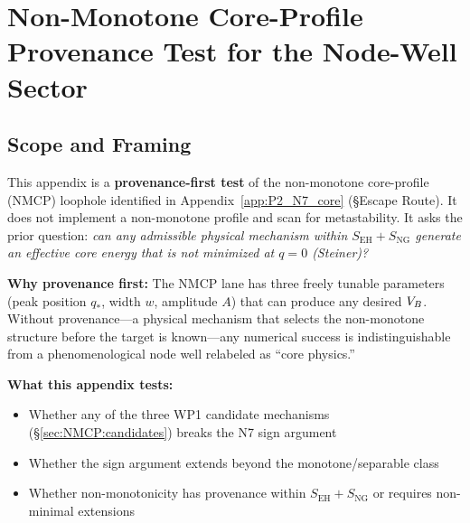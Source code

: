 
\chapter{Non-Monotone Core-Profile Provenance Test for the Node-Well Sector}
\label{app:P2_NMCP}

\section{Scope and Framing}
\label{sec:NMCP:scope}

This appendix is a \textbf{provenance-first test} of the non-monotone
core-profile (NMCP) loophole identified in Appendix~\ref{app:P2_N7_core}
(\S Escape Route). It does not implement a non-monotone profile and
scan for metastability. It asks the prior question: \emph{can any
admissible physical mechanism within $S_{\mathrm{EH}} + S_{\mathrm{NG}}$
generate an effective core energy that is not minimized at
$q = 0$ (Steiner)?}

\textbf{Why provenance first:} The NMCP lane has three freely tunable
parameters (peak position $q_*$, width $w$, amplitude $A$) that can
produce any desired $V_B$. Without provenance---a physical mechanism
that selects the non-monotone structure before the target is
known---any numerical success is indistinguishable from a
phenomenological node well relabeled as ``core physics.''

\textbf{What this appendix tests:}
\begin{itemize}
    \item Whether any of the three WP1 candidate mechanisms
          (\S\ref{sec:NMCP:candidates}) breaks the N7 sign argument
    \item Whether the sign argument extends beyond the monotone/separable
          class
    \item Whether non-monotonicity has provenance within
          $S_{\mathrm{EH}} + S_{\mathrm{NG}}$ or requires
          non-minimal extensions
\end{itemize}

